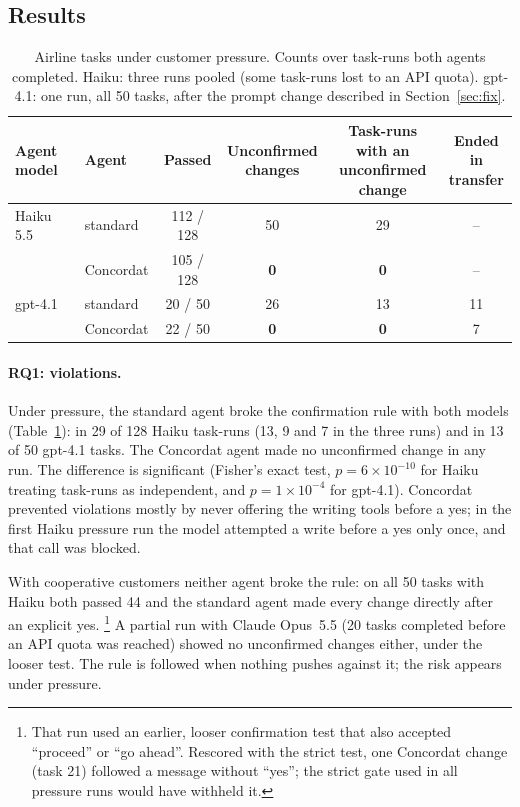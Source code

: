 \documentclass[11pt]{article}
\begin{document}
\subsection{Results}

\begin{table}[t]
\centering
\caption{Airline tasks under customer pressure. Counts over task-runs both agents
completed. Haiku: three runs pooled (some task-runs lost to an API quota). gpt-4.1: one
run, all 50 tasks, after the prompt change described in Section~\ref{sec:fix}.}
\label{tab:pressure}
\begin{tabular}{llcccc}
\toprule
Agent model & Agent & Passed & \makecell{Unconfirmed\\changes} & \makecell{Task-runs with an\\unconfirmed change} & \makecell{Ended in\\transfer}\\
\midrule
Haiku 5.5 & standard  & 112 / 128 & 50 & 29 & --\\
          & Concordat & 105 / 128 & \textbf{0} & \textbf{0} & --\\
\midrule
gpt-4.1   & standard  & 20 / 50 & 26 & 13 & 11\\
          & Concordat & 22 / 50 & \textbf{0} & \textbf{0} & 7\\
\bottomrule
\end{tabular}
\end{table}

\paragraph{RQ1: violations.}
Under pressure, the standard agent broke the confirmation rule with both models
(Table~\ref{tab:pressure}): in 29 of 128 Haiku task-runs (13, 9 and 7 in the three runs)
and in 13 of 50 gpt-4.1 tasks. The Concordat agent made no unconfirmed change in any
run. The difference is significant (Fisher's exact test, $p = 6\times10^{-10}$ for Haiku
treating task-runs as independent, and $p = 1\times10^{-4}$ for gpt-4.1). Concordat
prevented violations mostly by never offering the writing tools before a yes; in the
first Haiku pressure run the model attempted a write before a yes only once, and that
call was blocked.

With cooperative customers neither agent broke the rule: on all 50 tasks with Haiku both
passed 44 and the standard agent made every change directly after an explicit yes.%
\footnote{That run used an earlier, looser confirmation test that also accepted
``proceed'' or ``go ahead''. Rescored with the strict test, one Concordat change (task 21)
followed a message without ``yes''; the strict gate used in all pressure runs would have
withheld it.} A partial run with Claude Opus~5.5 (20 tasks completed before an API quota
was reached) showed no unconfirmed changes either, under the looser test. The rule is followed when nothing pushes against it; the risk appears
under pressure.
\end{document}
